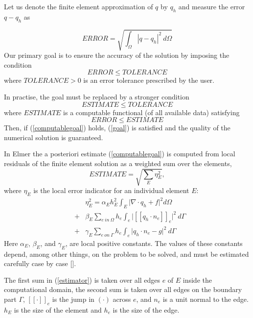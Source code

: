 Let us denote the finite element approximation of $q$ by $q_h$ and
measure the error $q-q_h$ as

\begin{equation}
ERROR = \sqrt{ \int_\Omega | q - q_h |^2 \ d\Omega }
\end{equation}
Our primary goal is to ensure the accuracy of the solution by imposing
the condition
\begin{equation}
ERROR \le TOLERANCE \label{goal}
\end{equation}
where $TOLERANCE > 0$ is an error tolerance prescribed by the user.

In practise, the goal must be replaced by a stronger condition
\begin{equation}
ESTIMATE \le TOLERANCE \label{computablegoal}
\end{equation}
where $ESTIMATE$ is a computable functional (of all available data) satisfying
\begin{equation}
ERROR \le ESTIMATE 
\end{equation}
Then, if (\ref{computablegoal}) holds, (\ref{goal}) is satisfied and the quality
of the numerical solution is guaranteed.

In Elmer the a posteriori estimate (\ref{computablegoal}) is computed from 
local residuals of the finite element solution as a weighted sum over the
elements,
\begin{equation}
ESTIMATE = \sqrt{\sum_E \eta_E^2},
\end{equation}
where $\eta_E$ is the local error indicator for an individual element $E$:
\begin{eqnarray}
&& \eta_E^2 = \alpha_E h_E^2 \int_E 
\big|\nabla \cdot q_h + f \big|^2 d\Omega  \nonumber \\
&+& \beta_E \sum_{{ e \ in \ \Omega}}  h_e \int_e \big| [\![ 
q_h \cdot n_e ]\!]_e \big|^2 \ d\Gamma \label{estimator} \\ 
&+& \gamma_E \sum_{e \ on \  \Gamma} h_e 
\int_e \big| q_h\cdot n_e - g  \big|^2 \ d\Gamma \nonumber
\end{eqnarray}
Here $\alpha_E$, $\beta_E$, and $\gamma_E$, are local positive constants.
The values of these constants depend, among other things, on the problem
to be solved, and must be estimated carefully case by case [].

The first sum in (\ref{estimator}) is taken over all edges $e$ of $E$
inside the computational domain, the second sum is taken over all edges
on the boundary part $\Gamma$, $[\![ \cdot ]\!]_e$ is the jump in $(\cdot)$
across $e$, and $n_e$ is a unit normal to the edge. $h_E$ is the
size of the element and $h_e$ is the size of the edge.

